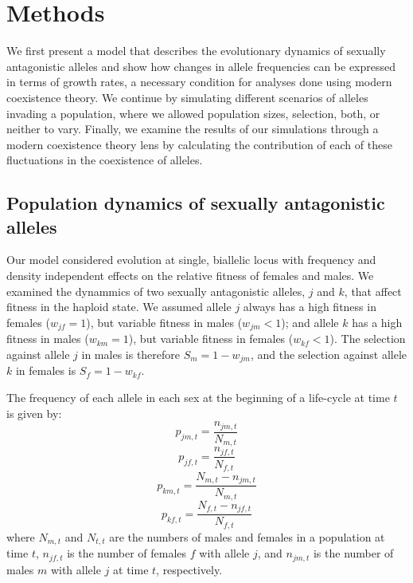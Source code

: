 \section{Methods}

We first present  a model that describes the evolutionary dynamics of sexually antagonistic alleles and show how changes in allele frequencies can be expressed in terms of growth rates, a necessary condition for analyses done using modern coexistence theory. We continue by simulating different scenarios of alleles invading a population, where we allowed population sizes, selection, both, or neither to vary. Finally, we examine the results of our simulations through a modern coexistence theory lens by calculating the contribution of each of these fluctuations in the coexistence of alleles.


\subsection*{Population dynamics of sexually antagonistic alleles}

 Our model considered evolution at single, biallelic  locus with frequency and density independent effects on the relative fitness of females and males. We examined the dynammics of two  sexually antagonistic alleles, $j$ and $k$, that affect fitness in the haploid state. We assumed allele $j$ always has a high fitness in females ($w_{jf} = 1$), but variable fitness in males ($w_{jm} < 1$); and allele $k$ has a high fitness in males ($w_{km} = 1$), but variable fitness in females ($w_{kf} < 1 $). The selection against allele $j$ in males is therefore $S_{m}= 1 - w_{jm}$, and the selection against allele $k$ in females is $S_{f}= 1 - w_{kf}$.

 The frequency of each allele in each sex at the beginning of a life-cycle at time $t$ is given by:
 \begin{equation}
     p_{jm,t}= \frac{n_{jm,t}}{N_{m,t}}
     \label{first_pop}
 \end{equation}
 \begin{equation}
     p_{jf,t}= \frac{n_{jf,t}}{N_{f,t}}
 \end{equation}
 \begin{equation}
     p_{km,t}= \frac{N_{m,t}-n_{jm,t}}{N_{m,t}}
 \end{equation}
 \begin{equation}
     p_{kf,t}= \frac{N_{f,t}-n_{jf,t}}{N_{f,t}}
 \end{equation}
 where $N_{m,t}$ and $N_{t,t}$ are the numbers of males and females in a population at time $t$, $n_{jf,t}$ is the number of females $f$ with allele $j$, and $n_{jm,t}$ is the number of males $m$ with allele $j$ at time $t$, respectively.

